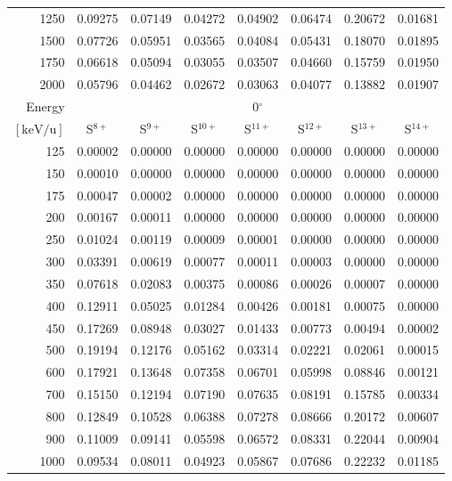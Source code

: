 \begin{longtable}{r|c|c|c|c|c|c|c}
     1250 & 0.09275 & 0.07149 & 0.04272 & 0.04902 & 0.06474 & 0.20672 & 0.01681 \\
     1500 & 0.07726 & 0.05951 & 0.03565 & 0.04084 & 0.05431 & 0.18070 & 0.01895 \\
     1750 & 0.06618 & 0.05094 & 0.03055 & 0.03507 & 0.04660 & 0.15759 & 0.01950 \\
     2000 & 0.05796 & 0.04462 & 0.02672 & 0.03063 & 0.04077 & 0.13882 & 0.01907 \\
     \cline{1-8}
    Energy & \multicolumn{7}{c}{0$^\circ$} \\ \cline{2-8}
    $\mathrm{[keV/u]}$ & S$^{8+}$ & S$^{9+}$ & S$^{10+}$ & S$^{11+}$ & S$^{12+}$ & S$^{13+}$ & S$^{14+}$ \\ \cline{1-8}
      125 & 0.00002 & 0.00000 & 0.00000 & 0.00000 & 0.00000 & 0.00000 & 0.00000 \\
      150 & 0.00010 & 0.00000 & 0.00000 & 0.00000 & 0.00000 & 0.00000 & 0.00000 \\
      175 & 0.00047 & 0.00002 & 0.00000 & 0.00000 & 0.00000 & 0.00000 & 0.00000 \\
      200 & 0.00167 & 0.00011 & 0.00000 & 0.00000 & 0.00000 & 0.00000 & 0.00000 \\
      250 & 0.01024 & 0.00119 & 0.00009 & 0.00001 & 0.00000 & 0.00000 & 0.00000 \\
      300 & 0.03391 & 0.00619 & 0.00077 & 0.00011 & 0.00003 & 0.00000 & 0.00000 \\
      350 & 0.07618 & 0.02083 & 0.00375 & 0.00086 & 0.00026 & 0.00007 & 0.00000 \\
      400 & 0.12911 & 0.05025 & 0.01284 & 0.00426 & 0.00181 & 0.00075 & 0.00000 \\
      450 & 0.17269 & 0.08948 & 0.03027 & 0.01433 & 0.00773 & 0.00494 & 0.00002 \\
      500 & 0.19194 & 0.12176 & 0.05162 & 0.03314 & 0.02221 & 0.02061 & 0.00015 \\
      600 & 0.17921 & 0.13648 & 0.07358 & 0.06701 & 0.05998 & 0.08846 & 0.00121 \\
      700 & 0.15150 & 0.12194 & 0.07190 & 0.07635 & 0.08191 & 0.15785 & 0.00334 \\
      800 & 0.12849 & 0.10528 & 0.06388 & 0.07278 & 0.08666 & 0.20172 & 0.00607 \\
      900 & 0.11009 & 0.09141 & 0.05598 & 0.06572 & 0.08331 & 0.22044 & 0.00904 \\
     1000 & 0.09534 & 0.08011 & 0.04923 & 0.05867 & 0.07686 & 0.22232 & 0.01185 \\

\end{longtable}
